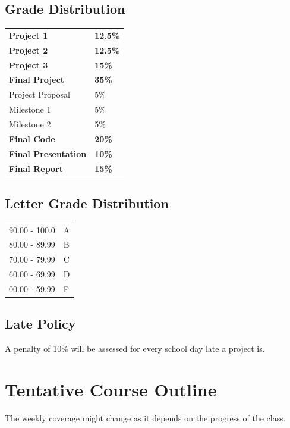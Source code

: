 \documentclass[11pt]{article}
\newcommand\tab[1][.5in]{\hspace*{#1}}
\begin{document}
\subsection{Grade Distribution}
\begin{tabular}{ll}
    \textbf{Project 1} & \textbf{12.5\%} \\
    \textbf{Project 2} & \textbf{12.5\%} \\
    \textbf{Project 3} & \textbf{15\%} \\
    \textbf{Final Project} & \textbf{35\%} \\
    \tab Project Proposal & 5\% \\
    \tab Milestone 1 & 5\% \\
    \tab Milestone 2 & 5\% \\
    \textbf{Final Code} & \textbf{20\%} \\
    \textbf{Final Presentation} & \textbf{10\%} \\
    \textbf{Final Report} & \textbf{15\%} \\
\end{tabular}

\subsection{Letter Grade Distribution}
\begin{tabular}{ll}
    90.00 - 100.0 & A \\
    80.00 - 89.99 & B \\
    70.00 - 79.99 & C \\
    60.00 - 69.99 & D \\
    00.00 - 59.99 & F
\end{tabular}

\subsection{Late Policy}
A penalty of 10\% will be assessed for every school day late a project is.

\newpage

\section{Tentative Course Outline}

The weekly coverage might change as it depends on the progress of the class.
\end{document}
